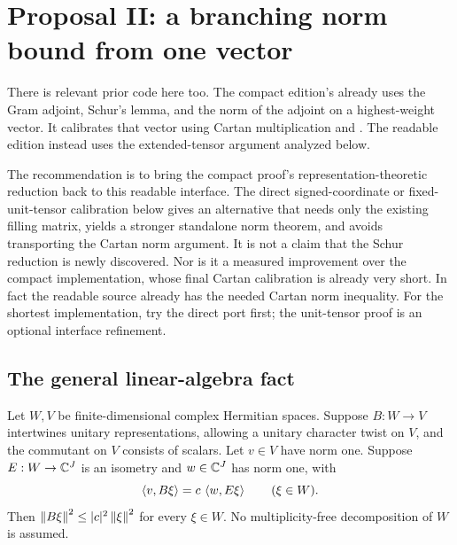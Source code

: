 \section{Proposal II: a branching norm bound from one vector}
\label{sec:branch}

There is relevant prior code here too. The compact edition's
already uses the Gram adjoint, Schur's lemma, and the norm of the adjoint
on a highest-weight vector. It calibrates that vector using Cartan
multiplication and .
The readable edition instead uses the extended-tensor argument analyzed below.

The recommendation is to bring the compact proof's representation-theoretic
reduction back to this readable interface. The direct signed-coordinate
or fixed-unit-tensor calibration below gives an alternative that needs
only the existing filling matrix, yields a stronger standalone norm theorem,
and avoids transporting the Cartan norm argument. It is not a claim that
the Schur reduction is newly discovered. Nor is it a measured improvement
over the compact implementation, whose final Cartan calibration is already
very short. In fact the readable source already has the needed Cartan
norm inequality. For the shortest implementation, try the direct port
first; the unit-tensor proof is an optional interface refinement.

\subsection{The general linear-algebra fact}

\begin{theorem}
\label{thm:onevector}
Let \(W,V\) be finite-dimensional complex Hermitian spaces. Suppose \(B:W\to V\)
intertwines unitary representations, allowing a unitary character twist
on \(V\), and the commutant on \(V\) consists of scalars. Let \(v\in V\)
have norm one. Suppose \(E:W\to\mathbb C^J\) is an isometry and \(w\in\mathbb C^J\)
has norm one, with
\begin{equation}
 \left\langle v,B\xi\right\rangle=c\,\left\langle w,E\xi\right\rangle
 \qquad(\xi\in W).
\end{equation}
Then \(\left\lVert B\xi\right\rVert^2\le |c|^2\left\lVert\xi\right\rVert^2\) for every \(\xi\in W\).
No multiplicity-free decomposition of \(W\) is assumed.
\end{theorem}

